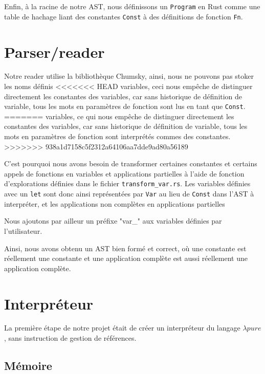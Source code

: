 \documentclass{rapportECL}
\begin{document}
\medskip

Enfin, à la racine de notre AST, nous définissons un \verb|Program| en Rust comme une table de hachage liant des constantes \verb|Const| à 
des définitions de fonction \verb|Fn|.

\bigskip

\section{Parser/reader}

Notre reader utilise la bibliothèque Chumsky\cite{zesterer_chumsky_nodate}, ainsi, nous ne pouvons pas stoker les noms définis 
<<<<<<< HEAD
variables, ceci nous empêche de distinguer directement les constantes des variables, car sans historique de définition de variable, 
tous les mots en paramètres de fonction sont lus en tant que \verb|Const|.
=======
variables, ce qui nous empêche de distinguer directement les constantes des variables, car sans historique de définition de variable, 
tous les mots en paramètres de fonction sont interprétés commes des constantes.
>>>>>>> 938a1d7158c5f2312a64106aa7dde9ad80a56189

C'est pourquoi nous avons besoin de transformer certaines constantes et certains appels de fonctions en variables et applications partielles à l'aide de 
fonction d'explorations définies dans le fichier \verb|transform_var.rs|.
Les variables définies avec un \verb|let| sont donc ainsi représentées par \verb|Var| au lieu de \verb|Const| dans l'AST à interpréter,
et les applications non complètes en applications partielles

Nous ajoutons par ailleur un préfixe "var\_" aux variables définies par l'utilisateur.

Ainsi, nous avons obtenu un AST bien formé et correct, où une constante est réellement une constante et une application
complète est aussi réellement une application complète.

\section{Interpréteur}

La première étape de notre projet était de créer un interpréteur du langage $\lambda{pure}$, sans instruction de gestion de références.

\subsection{Mémoire}
\end{document}
